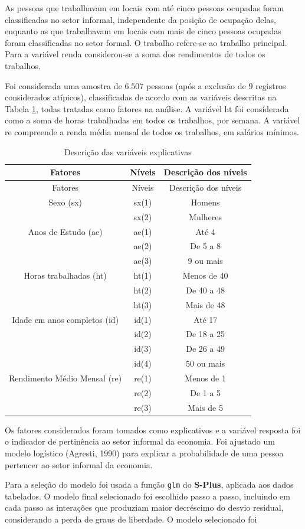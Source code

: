 \documentclass[]{book}
\theoremstyle{definition}
\theoremstyle{definition}
\theoremstyle{definition}
\theoremstyle{remark}
\begin{document}
As pessoas que trabalhavam em locais com até cinco pessoas ocupadas
foram classificadas no setor informal, independente da posição de
ocupação delas, enquanto as que trabalhavam em locais com mais de cinco
pessoas ocupadas foram classificadas no setor formal. O trabalho
refere-se ao trabalho principal. Para a variável renda considerou-se a
soma dos rendimentos de todos os trabalhos.

Foi considerada uma amostra de \(6.507\) pessoas (após a exclusão de
\(9\) registros considerados atípicos), classificadas de acordo com as
variáveis descritas na Tabela \ref{tab:varexp}, todas tratadas como
fatores na análise. A variável ht foi considerada como a soma de horas
trabalhadas em todos os trabalhos, por semana. A variável re compreende
a renda média mensal de todos os trabalhos, em salários mínimos.

\begin{longtable}[]{@{}ccc@{}}
\caption{\label{tab:varexp}Descrição das variáveis
explicativas}\tabularnewline
\toprule
Fatores & Níveis & Descrição dos níveis\tabularnewline
\midrule
\endfirsthead
\toprule
Fatores & Níveis & Descrição dos níveis\tabularnewline
\midrule
\endhead
Sexo (sx) & sx(1) & Homens\tabularnewline
\(~\) & sx(2) & Mulheres\tabularnewline
Anos de Estudo (ae) & ae(1) & Até 4\tabularnewline
\(~\) & ae(2) & De 5 a 8\tabularnewline
\(~\) & ae(3) & 9 ou mais\tabularnewline
Horas trabalhadas (ht) & ht(1) & Menos de 40\tabularnewline
\(~\) & ht(2) & De 40 a 48\tabularnewline
\(~\) & ht(3) & Mais de 48\tabularnewline
Idade em anos completos (id) & id(1) & Até 17\tabularnewline
\(~\) & id(2) & De 18 a 25\tabularnewline
\(~\) & id(3) & De 26 a 49\tabularnewline
\(~\) & id(4) & 50 ou mais\tabularnewline
Rendimento Médio Mensal (re) & re(1) & Menos de 1\tabularnewline
\(~\) & re(2) & De 1 a 5\tabularnewline
\(~\) & re(3) & Mais de 5\tabularnewline
\bottomrule
\end{longtable}

Os fatores considerados foram tomados como explicativos e a variável
resposta foi o indicador de pertinência ao setor informal da economia.
Foi ajustado um modelo logístico (Agresti, 1990) para explicar a
probabilidade de uma pessoa pertencer ao setor informal da economia.

Para a seleção do modelo foi usada a função \texttt{glm} do
\textbf{S-Plus}, aplicada aos dados tabelados. O modelo final
selecionado foi escolhido passo a passo, incluindo em cada passo as
interações que produziam maior decréscimo do desvio residual,
considerando a perda de graus de liberdade. O modelo selecionado foi
\end{document}
